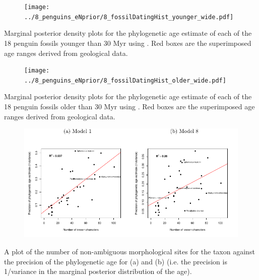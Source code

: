\begin{frame}
\begin{figure}
\texttt{[image: ../8\_penguins\_eNprior/8\_fossilDatingHist\_younger\_wide.pdf]}
\end{figure}
Marginal posterior density plots for the phylogenetic age estimate of each of the 18 penguin fossils younger than 30 Myr using \Mrelaxed{}. Red boxes are the superimposed age ranges derived from geological data.
\end{frame}

\begin{frame}
\begin{figure}
\texttt{[image: ../8\_penguins\_eNprior/8\_fossilDatingHist\_older\_wide.pdf]}
\end{figure}
Marginal posterior density plots for the phylogenetic age estimate of each of the 18 penguin fossils older than 30 Myr using \Mrelaxed{}. Red boxes are the superimposed age ranges derived from geological data.
\end{frame}

\begin{frame}
\begin{figure}
\includegraphics[width=\textwidth]{../Figure2.pdf}
\end{figure}
A plot of the number of non-ambiguous morphological sites for the taxon against the precision of the phylogenetic age for (a) \Mstrict{} and (b) \Mrelaxed{} (i.e. the precision is 1/variance in the marginal posterior distribution of the age).
\end{frame}


